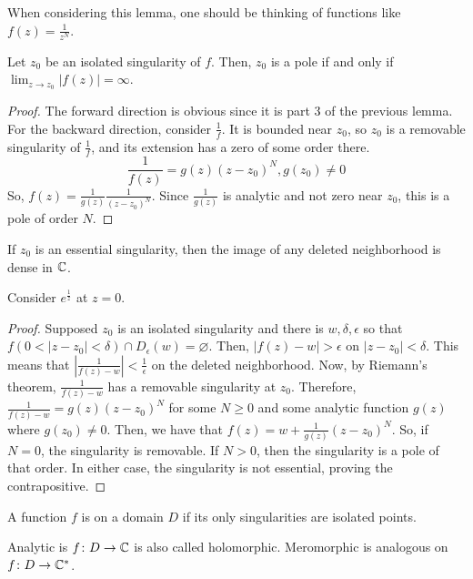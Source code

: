 \documentclass[11pt,leqno,oneside]{amsart}
\numberwithin{thm}{section}
\begin{document}
  When considering this lemma, one should be thinking of functions
  like $f(z) = \frac{1}{z^N}$.
  \begin{prop}
    Let $z_0$ be an isolated singularity of $f$. Then, $z_0$ is a pole
    if and only if $\lim_{z\to z_0} |f(z)| = \infty$.
  \end{prop}
  \begin{proof}
    The forward direction is obvious since it is part 3 of the
    previous lemma. For the backward direction, consider
    $\frac{1}{f}$. It is bounded near $z_0$, so $z_0$ is a removable
    singularity of $\frac{1}{f}$, and its extension has a zero of some
    order there. \[
      \frac{1}{f(z)} = g(z)(z-z_0)^N, g(z_0) \neq 0
    \]
    So, $f(z) = \frac{1}{g(z)}\frac{1}{(z-z_0)^N}$. Since
    $\frac{1}{g(z)}$ is analytic and not zero near $z_0$, this is a
    pole of order $N$.
  \end{proof}
  \begin{thm}
    If $z_0$ is an essential singularity, then the image of any
    deleted neighborhood is dense in ${\mathbb C}$.
  \end{thm}
  \begin{example}
    Consider $e^{\frac{1}{z}}$ at $z=0$.
  \end{example}
  \begin{proof}
    Supposed $z_0$ is an isolated singularity and there is
    $w,\delta,\epsilon$ so that $f(0 < |z-z_0| < \delta) \cap
    D_\epsilon(w) = \varnothing$. Then, $|f(z)-w| > \epsilon$ on
    $|z-z_0| < \delta$. This means that $\left| \frac{1}{f(z)-w}
    \right| < \frac{1}{\epsilon}$ on the deleted neighborhood. Now, by
    Riemann's theorem, $\frac{1}{f(z)-w}$ has a removable singularity
    at $z_0$. Therefore, $\frac{1}{f(z)-w} = g(z)(z-z_0)^N$ for some
    $N \geq 0$ and some analytic function $g(z)$ where $g(z_0) \neq
    0$. Then, we have that $f(z) = w + \frac{1}{g(z)}(z-z_0)^N$. So,
    if $N=0$, the singularity is removable. If $N > 0$, then the
    singularity is a pole of that order. In either case, the
    singularity is not essential, proving the contrapositive.
  \end{proof}
  \begin{defn}
    A function $f$ is  on a domain $D$ if its only
    singularities are isolated points.
  \end{defn}
  Analytic is $f\colon D \to {\mathbb C}$ is also called holomorphic. Meromorphic is
  analogous on $f\colon D \to {\mathbb C}^*$.
\end{document}
